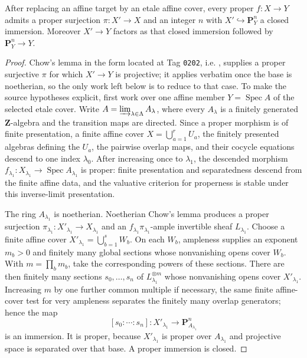 \begin{lemma}
\label{lemma:weil-pbc-chow-factorization}
\uses{}

After replacing an affine target by an etale affine cover, every proper
$f:X\to Y$ admits a proper surjection $\pi:X'\to X$ and an integer $n$ with
$X'\hookrightarrow\mathbf P^n_Y$ a closed immersion.  Moreover
$X'\to Y$ factors as that closed immersion followed by
$\mathbf P^n_Y\to Y$.
\end{lemma}
\begin{proof}

Chow's lemma in the form located at Tag \texttt{0202}, i.e.
, supplies a proper surjective $\pi$ for which
$X'\to Y$ is projective; it applies verbatim once the base is noetherian, so
the only work left below is to reduce to that case.  To make the source
hypotheses explicit, first work over one affine member $Y=\operatorname{Spec}A$
of the selected etale cover.  Write
$A=\varinjlim_{\lambda\in\Lambda}A_\lambda$, where every $A_\lambda$ is a
finitely generated $\mathbf Z$-algebra and the transition maps are directed.
Since a proper morphism is of finite presentation, a finite affine cover
$X=\bigcup_{a=1}^rU_a$, the finitely presented algebras defining the $U_a$,
the pairwise overlap maps, and their cocycle equations descend to one index
$\lambda_0$.  After increasing once to $\lambda_1$, the descended morphism
$f_{\lambda_1}:X_{\lambda_1}\to\operatorname{Spec}A_{\lambda_1}$ is proper:
finite presentation and separatedness descend from the finite affine data,
and the valuative criterion for properness is stable under this inverse-limit
presentation.

The ring $A_{\lambda_1}$ is noetherian.  Noetherian Chow's lemma produces a
proper surjection
$\pi_{\lambda_1}:X'_{\lambda_1}\to X_{\lambda_1}$ and an
$f_{\lambda_1}\pi_{\lambda_1}$-ample invertible sheaf $L_{\lambda_1}$.
Choose a finite affine cover $X'_{\lambda_1}=\bigcup_{b=1}^sW_b$.  On each
$W_b$, ampleness supplies an exponent $m_b>0$ and finitely many global
sections whose nonvanishing opens cover $W_b$.  With
$m=\prod_bm_b$, take the corresponding powers of these sections.  There are
then finitely many sections $s_0,\ldots,s_n$ of $L_{\lambda_1}^{\otimes m}$
whose nonvanishing opens cover $X'_{\lambda_1}$.  Increasing $m$ by one
further common multiple if necessary, the same finite affine-cover test for
very ampleness separates the finitely many overlap generators; hence the
map
\[
 [s_0:\cdots:s_n]:X'_{\lambda_1}\longrightarrow
 \mathbf P^n_{A_{\lambda_1}}
\]
is an immersion.  It is proper, because $X'_{\lambda_1}$ is proper over
$A_{\lambda_1}$ and projective space is separated over that base.  A proper
immersion is closed.


\end{proof}
